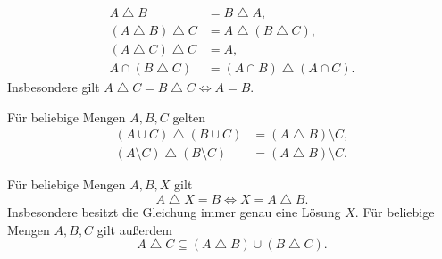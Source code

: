 \begin{theorem}
\[
\begin{aligned}
 A\mathbin{\triangle}B&=B\mathbin{\triangle}A,\\
 (A\mathbin{\triangle}B)\mathbin{\triangle}C
       &=A\mathbin{\triangle}(B\mathbin{\triangle}C),\\
 (A\mathbin{\triangle}C)\mathbin{\triangle}C&=A,\\
 A\cap(B\mathbin{\triangle}C)
       &=(A\cap B)\mathbin{\triangle}(A\cap C).
\end{aligned}
\]
Insbesondere gilt
$A\mathbin{\triangle}C=B\mathbin{\triangle}C
\Longleftrightarrow A=B$.
\cite{cameron}
\end{theorem}

\begin{theorem}
Für beliebige Mengen $A,B,C$ gelten
\[
\begin{aligned}
 (A\cup C)\mathbin{\triangle}(B\cup C)
     &=(A\mathbin{\triangle}B)\setminus C,\\
 (A\setminus C)\mathbin{\triangle}(B\setminus C)
     &=(A\mathbin{\triangle}B)\setminus C.
\end{aligned}
\]
\end{theorem}

\begin{theorem}
Für beliebige Mengen $A,B,X$ gilt
\[
 A\mathbin{\triangle}X=B
       \Longleftrightarrow X=A\mathbin{\triangle}B.
\]
Insbesondere besitzt die Gleichung immer genau eine Lösung $X$.
Für beliebige Mengen $A,B,C$ gilt außerdem
\[
 A\mathbin{\triangle}C
       \subseteq(A\mathbin{\triangle}B)\cup(B\mathbin{\triangle}C).
\]
\end{theorem}
